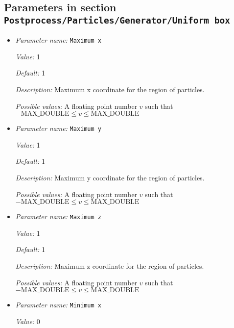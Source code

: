 \subsection{Parameters in section \tt Postprocess/Particles/Generator/Uniform box}
\label{parameters:Postprocess/Particles/Generator/Uniform_20box}

\begin{itemize}
\item {\it Parameter name:} {\tt Maximum x}
\label{parameters:Postprocess/Particles/Generator/Uniform box/Maximum x}


{\it Value:} 1


{\it Default:} 1


{\it Description:} Maximum x coordinate for the region of particles.


{\it Possible values:} A floating point number $v$ such that $-\text{MAX\_DOUBLE} \leq v \leq \text{MAX\_DOUBLE}$
\item {\it Parameter name:} {\tt Maximum y}
\label{parameters:Postprocess/Particles/Generator/Uniform box/Maximum y}


{\it Value:} 1


{\it Default:} 1


{\it Description:} Maximum y coordinate for the region of particles.


{\it Possible values:} A floating point number $v$ such that $-\text{MAX\_DOUBLE} \leq v \leq \text{MAX\_DOUBLE}$
\item {\it Parameter name:} {\tt Maximum z}
\label{parameters:Postprocess/Particles/Generator/Uniform box/Maximum z}


{\it Value:} 1


{\it Default:} 1


{\it Description:} Maximum z coordinate for the region of particles.


{\it Possible values:} A floating point number $v$ such that $-\text{MAX\_DOUBLE} \leq v \leq \text{MAX\_DOUBLE}$
\item {\it Parameter name:} {\tt Minimum x}
\label{parameters:Postprocess/Particles/Generator/Uniform box/Minimum x}


{\it Value:} 0



\end{itemize}
